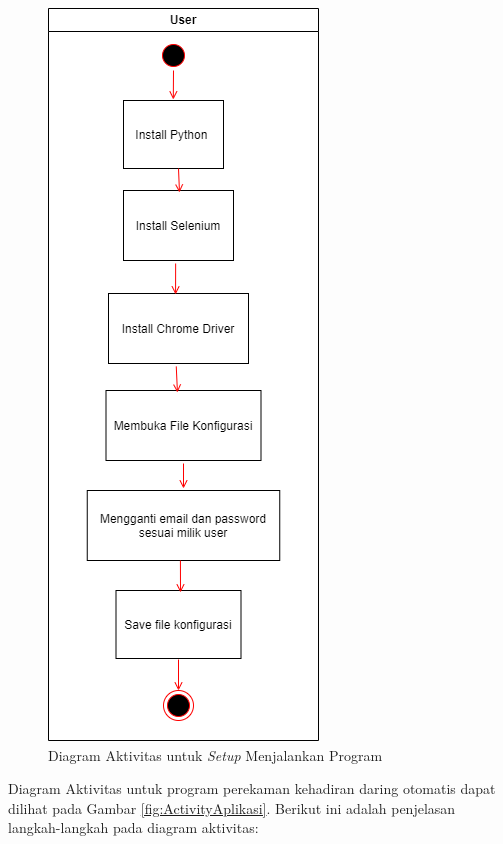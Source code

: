 \begin{figure}[H]
	\centering
	\includegraphics[scale=0.4]{Gambar/ActivitySetup.png}
	\caption{Diagram Aktivitas untuk \textit{Setup} Menjalankan Program} 
	\label{fig:ActivitySetup}
\end{figure}
Diagram Aktivitas untuk program perekaman kehadiran daring otomatis dapat dilihat pada Gambar \ref{fig:ActivityAplikasi}. Berikut ini adalah penjelasan langkah-langkah pada diagram aktivitas:
